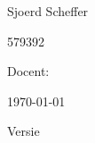 \begin{titlepage}
    \sffamily
    \begin{center}
    \vspace*{1cm}

    \color{hanA}\huge\textbf{\thetitle}
    
    \vspace{0.5cm}

    \color{hanB}\Large \csubtitle

    \vspace{1.5cm}\color{black}

    Sjoerd Scheffer

    \vspace{0.1cm}

    579392

    \vfill

    

    \vspace{2.0cm}\large

    Docent: \teacher

    \vspace{1.0cm}\normalsize

    \today

    \vspace{0.5cm}

    Versie \version
    
    \end{center}
\end{titlepage}
\cleardoublepage
\tableofcontents
\clearpage
\listoftables
\listoffigures
\clearpage
